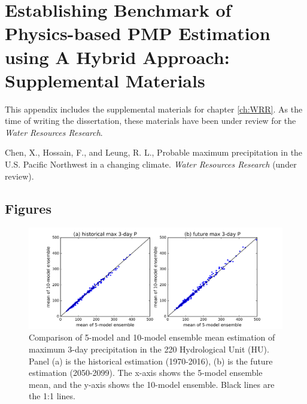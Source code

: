 \chapter{Establishing Benchmark of Physics-based PMP Estimation using A Hybrid Approach: Supplemental Materials}


This appendix includes the supplemental materials for chapter \ref{ch:WRR}. As the time of writing the dissertation, these materials have been under review for the \textit{Water Resources Research}.

\bigbreak

\noindent
{}
\setlength{\hangindent}{2em}
Chen, X., Hossain, F., and Leung, R. L., Probable maximum precipitation in the U.S. Pacific Northwest in a changing climate. \textit{Water Resources Research} (under review).

\vspace{10mm}

\noindent

\section{Figures}

\begin{figure}[htbp]
	\includegraphics[width=\linewidth]{pics/ch5/figS1.png}
	\caption{Comparison of 5-model and 10-model ensemble mean estimation of maximum 3-day precipitation in the 220 Hydrological Unit (HU). Panel (a) is the historical estimation (1970-2016), (b) is the future estimation (2050-2099). The x-axis shows the 5-model ensemble mean, and the y-axis shows the 10-model ensemble. Black lines are the 1:1 lines.}
	\label{fig:5-S1}
\end{figure}

